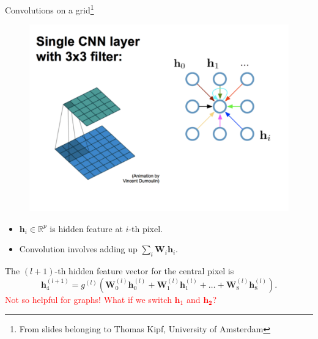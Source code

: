 \documentclass{beamer}
\begin{document}
\begin{frame}{Convolutions on a grid\footnote{From slides belonging to Thomas Kipf, University of Amsterdam}}
\begin{minipage}{0.49\linewidth}

\begin{figure}
\includegraphics[width=\linewidth]{Images/CNNGNN.png}
\end{figure}
\end{minipage}
\begin{minipage}{0.49\linewidth}

\begin{itemize}
\item $\mathbf{h}_i \in \mathbb{R}^p$ is hidden feature at $i$-th pixel.
\item Convolution involves adding up $\sum_i\mathbf{W}_i\mathbf{h}_i$.
\end{itemize}
\end{minipage}
The $(l+1)$-th hidden feature vector for the central pixel is
\[
\mathbf{h}_4^{(l+1)}=g^{(l)}\left(\mathbf{W}^{(l)}_0\mathbf{h}_0^{(l)}+\mathbf{W}^{(l)}_1\mathbf{h}_1^{(l)}+\dots+\mathbf{W}^{(l)}_8\mathbf{h}_8^{(l)}\right).
\]
\textcolor{red}{Not so helpful for graphs! What if we switch $\mathbf{h}_1$ and $\mathbf{h_2}$?}
\end{frame}
\end{document}
